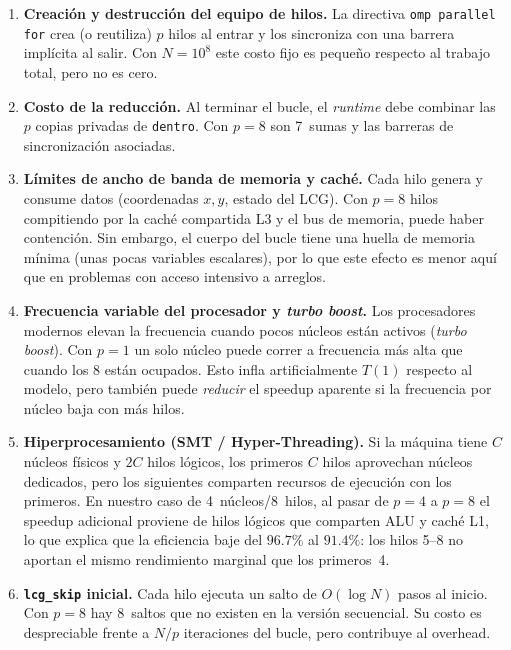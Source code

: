 \documentclass[12pt,a4paper]{article}
\begin{document}
\begin{enumerate}
  \item \textbf{Creaci\'on y destrucci\'on del equipo de hilos.} La directiva \texttt{omp parallel for} crea (o reutiliza) $p$ hilos al entrar y los sincroniza con una barrera impl\'icita al salir. Con $N=10^8$ este costo fijo es peque\~no respecto al trabajo total, pero no es cero.

  \item \textbf{Costo de la reducci\'on.} Al terminar el bucle, el \emph{runtime} debe combinar las $p$ copias privadas de \texttt{dentro}. Con $p=8$ son 7~sumas y las barreras de sincronizaci\'on asociadas.

  \item \textbf{L\'imites de ancho de banda de memoria y cach\'e.} Cada hilo genera y consume datos (coordenadas $x,y$, estado del LCG). Con $p=8$ hilos compitiendo por la cach\'e compartida L3 y el bus de memoria, puede haber contenci\'on. Sin embargo, el cuerpo del bucle tiene una huella de memoria m\'inima (unas pocas variables escalares), por lo que este efecto es menor aqu\'i que en problemas con acceso intensivo a arreglos.

  \item \textbf{Frecuencia variable del procesador y \emph{turbo boost}.} Los procesadores modernos elevan la frecuencia cuando pocos n\'ucleos est\'an activos (\emph{turbo boost}). Con $p=1$ un solo n\'ucleo puede correr a frecuencia m\'as alta que cuando los 8 est\'an ocupados. Esto infla artificialmente $T(1)$ respecto al modelo, pero tambi\'en puede \emph{reducir} el speedup aparente si la frecuencia por n\'ucleo baja con m\'as hilos.

  \item \textbf{Hiperprocesamiento (SMT / Hyper-Threading).} Si la m\'aquina tiene $C$ n\'ucleos f\'isicos y $2C$ hilos l\'ogicos, los primeros $C$ hilos aprovechan n\'ucleos dedicados, pero los siguientes comparten recursos de ejecuci\'on con los primeros. En nuestro caso de 4~n\'ucleos/8~hilos, al pasar de $p=4$ a $p=8$ el speedup adicional proviene de hilos l\'ogicos que comparten ALU y cach\'e L1, lo que explica que la eficiencia baje del $96.7\%$ al $91.4\%$: los hilos 5--8 no aportan el mismo rendimiento marginal que los primeros~4.

  \item \textbf{\texttt{lcg\_skip} inicial.} Cada hilo ejecuta un salto de $O(\log N)$ pasos al inicio. Con $p=8$ hay 8~saltos que no existen en la versi\'on secuencial. Su costo es despreciable frente a $N/p$ iteraciones del bucle, pero contribuye al overhead.
\end{enumerate}
\end{document}
